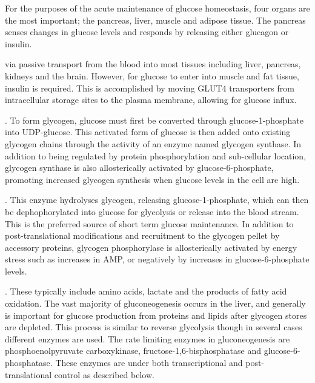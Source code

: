 \documentclass{tufte-handout}
\begin{document}
For the purposes of the acute maintenance of glucose homeostasis, four organs are the most important; the pancreas, liver, muscle and adipose tissue.  The pancreas senses changes in glucose levels and responds by releasing either glucagon or insulin. 

 via passive transport from the blood into most tissues including liver, pancreas, kidneys and the brain.  However, for glucose to enter into muscle and fat tissue, insulin is required.  This is accomplished by moving GLUT4 transporters from intracellular storage sites to the plasma membrane, allowing for glucose influx.  

.  To form glycogen, glucose must first be converted through glucose-1-phosphate into UDP-glucose.  This activated form of glucose is then added onto existing glycogen chains through the activity of an enzyme named glycogen synthase.  In addition to being regulated by protein phosphorylation and sub-cellular location, glycogen synthase is also allosterically activated by glucose-6-phosphate, promoting increased glycogen synthesis when glucose levels in the cell are high.

.  This enzyme hydrolyses glycogen, releasing glucose-1-phosphate, which can then be dephophorylated into glucose for glycolysis or release into the blood stream.  This is the preferred source of short term glucose maintenance.  In addition to post-translational modifications and recruitment to the glycogen pellet by accessory proteins, glycogen phosphorylase is allosterically activated by energy stress such as increases in AMP, or negatively by increases in glucose-6-phosphate levels.

.  These typically include amino acids, lactate and the products of fatty acid oxidation.  The vast majority of gluconeogenesis occurs in the liver, and generally is important for glucose production from proteins and lipids after glycogen stores are depleted.  This process is similar to reverse glycolysis though in several cases different enzymes are used.  The rate limiting enzymes in gluconeogenesis are phosphoenolpyruvate carboxykinase, fructose-1,6-bisphosphatase and glucose-6-phosphatase.  These enzymes are under both transcriptional and post-translational control as described below.
\end{document}
